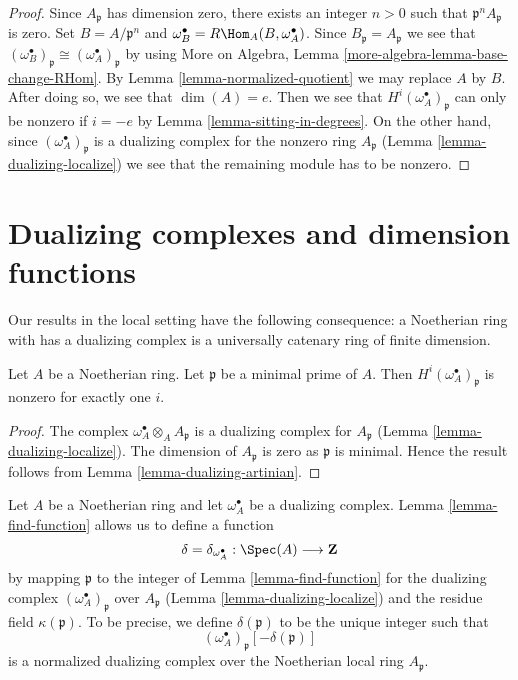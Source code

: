 \begin{proof}
Since $A_\mathfrak p$ has dimension zero, there exists an integer
$n > 0$ such that $\mathfrak p^nA_\mathfrak p$ is zero.
Set $B = A/\mathfrak p^n$ and
$\omega_B^\bullet = R\Hom_A(B, \omega_A^\bullet)$.
Since $B_\mathfrak p = A_\mathfrak p$ we see that
$(\omega_B^\bullet)_\mathfrak p \cong (\omega_A^\bullet)_\mathfrak p$
by using More on Algebra, Lemma \ref{more-algebra-lemma-base-change-RHom}.
By Lemma \ref{lemma-normalized-quotient} we may replace $A$ by $B$.
After doing so, we see that $\dim(A) = e$. Then we see that
$H^i(\omega_A^\bullet)_\mathfrak p$ can only be nonzero if $i = -e$
by Lemma \ref{lemma-sitting-in-degrees}.
On the other hand, since $(\omega_A^\bullet)_\mathfrak p$
is a dualizing complex for the nonzero ring $A_\mathfrak p$
(Lemma \ref{lemma-dualizing-localize})
we see that the remaining module has to be nonzero.
\end{proof}





\section{Dualizing complexes and dimension functions}
\label{section-dimension-function}

\noindent
Our results in the local setting have the following consequence:
a Noetherian ring with has a dualizing complex is a
universally catenary ring of finite dimension.

\begin{lemma}
\label{lemma-nonvanishing-generically}
Let $A$ be a Noetherian ring. Let $\mathfrak p$ be a minimal prime
of $A$. Then $H^i(\omega_A^\bullet)_\mathfrak p$ is nonzero
for exactly one $i$.
\end{lemma}

\begin{proof}
The complex $\omega_A^\bullet \otimes_A A_\mathfrak p$
is a dualizing complex for $A_\mathfrak p$
(Lemma \ref{lemma-dualizing-localize}).
The dimension of $A_\mathfrak p$ is zero as $\mathfrak p$
is minimal. Hence the result follows from
Lemma \ref{lemma-dualizing-artinian}.
\end{proof}

\noindent
Let $A$ be a Noetherian ring and let $\omega_A^\bullet$ be a dualizing
complex. Lemma \ref{lemma-find-function} allows us to define a function
$$
\delta = \delta_{\omega_A^\bullet} : \Spec(A) \longrightarrow \mathbf{Z}
$$
by mapping $\mathfrak p$ to the integer of Lemma \ref{lemma-find-function}
for the dualizing complex $(\omega_A^\bullet)_\mathfrak p$
over $A_\mathfrak p$ (Lemma \ref{lemma-dualizing-localize})
and the residue field $\kappa(\mathfrak p)$. To be precise, we define
$\delta(\mathfrak p)$ to be the unique integer such that
$$
(\omega_A^\bullet)_\mathfrak p[-\delta(\mathfrak p)]
$$
is a normalized dualizing complex over the Noetherian local ring
$A_\mathfrak p$.

